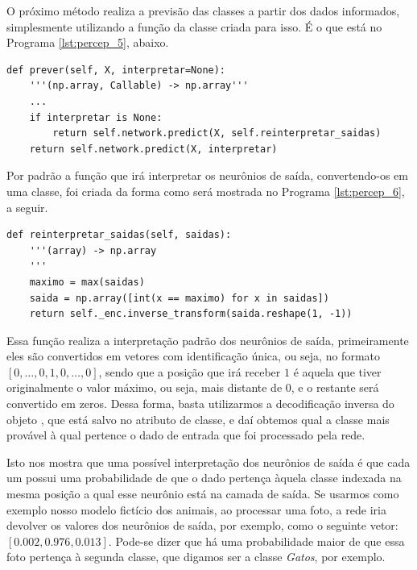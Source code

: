 O próximo método realiza a previsão das classes a partir dos dados informados, simplesmente utilizando a função da classe  criada para isso. É o que está no Programa \ref{lst:percep_5}, abaixo. 
\newline
\estiloR
\begin{lstlisting}[caption={Trecho da classe \eng{Perceptron}}, label={lst:percep_5}, escapeinside={\%}]
def prever(self, X, interpretar=None):
    '''(np.array, Callable) -> np.array'''
    ...
    if interpretar is None:
        return self.network.predict(X, self.reinterpretar_saidas)
    return self.network.predict(X, interpretar)
\end{lstlisting}


Por padrão a função que irá interpretar os neurônios de saída, convertendo-os em uma classe, foi criada da forma como será mostrada no Programa \ref{lst:percep_6}, a seguir.
\newline
\estiloR
\begin{lstlisting}[caption={Trecho da classe \eng{Perceptron}}, label={lst:percep_6}, escapeinside={\%}]
def reinterpretar_saidas(self, saidas):
    '''(array) -> np.array
    '''
    maximo = max(saidas)
    saida = np.array([int(x == maximo) for x in saidas])
    return self._enc.inverse_transform(saida.reshape(1, -1))
\end{lstlisting}


Essa função realiza a interpretação padrão dos neurônios de saída, primeiramente eles são convertidos em vetores com identificação única, ou seja, no formato $[0, \ldots,0, 1, 0, \ldots, 0]$, sendo que a posição que irá receber $1$ é aquela que tiver originalmente o valor máximo, ou seja, mais distante de $0$, e o restante será convertido em zeros. Dessa forma, basta utilizarmos a decodificação inversa do objeto , que está salvo no atributo de classe, e daí obtemos qual a classe mais provável à qual pertence o dado de entrada que foi processado pela rede.

Isto nos mostra que uma possível interpretação dos neurônios de saída é que cada um possui uma probabilidade de que o dado pertença àquela classe indexada na mesma posição a qual esse neurônio está na camada de saída. Se usarmos como exemplo nosso modelo fictício dos animais, ao processar uma foto, a rede iria devolver os valores dos neurônios de saída, por exemplo, como o seguinte vetor: $[0.002, 0.976, 0.013]$. Pode-se dizer que há uma probabilidade maior de que essa foto pertença à segunda classe, que digamos ser a classe \emph{Gatos}, por exemplo.

